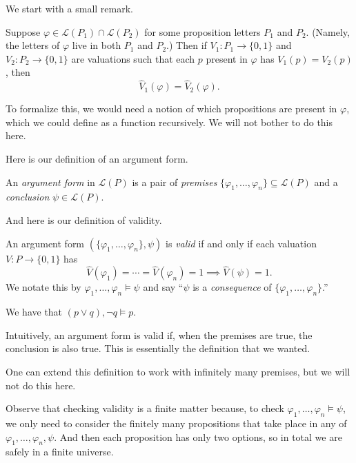 We start with a small remark.
\begin{remark}
	Suppose $\varphi\in\mathcal L(P_1)\cap\mathcal L(P_2)$ for some proposition letters $P_1$ and $P_2$. (Namely, the letters of $\varphi$ live in both $P_1$ and $P_2$.) Then if $V_1:P_1\to\{0,1\}$ and $V_2:P_2\to\{0,1\}$ are valuations such that each $p$ present in $\varphi$ has $V_1(p)=V_2(p)$, then
	\[\hat V_1(\varphi)=\hat V_2(\varphi).\]
\end{remark}
To formalize this, we would need a notion of which propositions are present in $\varphi$, which we could define as a function recursively. We will not bother to do this here.

Here is our definition of an argument form.
\begin{definition}
	An \textit{argument form} in $\mathcal L(P)$ is a pair of \textit{premises} $\{\varphi_1,\ldots,\varphi_n\}\subseteq\mathcal L(P)$ and a \textit{conclusion} $\psi\in\mathcal L(P)$.
\end{definition}
And here is our definition of validity.
\begin{definition}[Valid]
	An argument form $(\{\varphi_1,\ldots,\varphi_n\},\psi)$ is \textit{valid} if and only if each valuation $V:P\to\{0,1\}$ has
	\[\hat V(\varphi_1)=\cdots=\hat V(\varphi_n)=1\implies\hat V(\psi)=1.\]
	We notate this by $\varphi_1,\ldots,\varphi_n\models\psi$ and say ``$\psi$ is a \textit{consequence} of $\{\varphi_1,\ldots,\varphi_n\}$.''
\end{definition}
\begin{example}
	We have that $(p\lor q),\lnot q\models p$.
\end{example}
Intuitively, an argument form is valid if, when the premises are true, the conclusion is also true. This is essentially the definition that we wanted.
\begin{remark}
	One can extend this definition to work with infinitely many premises, but we will not do this here.
\end{remark}

Observe that checking validity is a finite matter because, to check $\varphi_1,\ldots,\varphi_n\models\psi$, we only need to consider the finitely many propositions that take place in any of $\varphi_1,\ldots,\varphi_n,\psi$. And then each proposition has only two options, so in total we are safely in a finite universe.